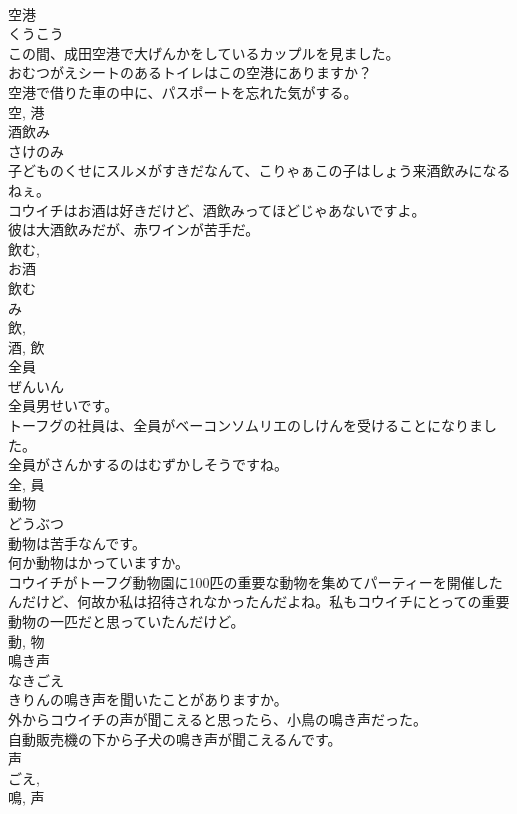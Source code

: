 \documentclass[8pt]{extreport}
\begin{document}
\begin{CJK}{UTF8}{min}
\\	空港	
\\	くうこう	
\\	この間、成田空港で大げんかをしているカップルを見ました。	
\\	おむつがえシートのあるトイレはこの空港にありますか？	
\\	空港で借りた車の中に、パスポートを忘れた気がする。	
\\	空, 港	
\\	酒飲み	
\\	さけのみ	
\\	子どものくせにスルメがすきだなんて、こりゃぁこの子はしょう来酒飲みになるねぇ。	
\\	コウイチはお酒は好きだけど、酒飲みってほどじゃあないですよ。	
\\	彼は大酒飲みだが、赤ワインが苦手だ。	
\\	飲む, 
\\	お酒 
\\	飲む 
\\	み 
\\	飲, 
\\	酒, 飲	
\\	全員	
\\	ぜんいん	
\\	全員男せいです。	
\\	トーフグの社員は、全員がベーコンソムリエのしけんを受けることになりました。	
\\	全員がさんかするのはむずかしそうですね。	
\\	全, 員	
\\	動物	
\\	どうぶつ	
\\	動物は苦手なんです。	
\\	何か動物はかっていますか。	
\\	コウイチがトーフグ動物園に100匹の重要な動物を集めてパーティーを開催したんだけど、何故か私は招待されなかったんだよね。私もコウイチにとっての重要動物の一匹だと思っていたんだけど。	
\\	動, 物	
\\	鳴き声	
\\	なきごえ	
\\	きりんの鳴き声を聞いたことがありますか。	
\\	外からコウイチの声が聞こえると思ったら、小鳥の鳴き声だった。	
\\	自動販売機の下から子犬の鳴き声が聞こえるんです。	
\\	声 
\\	ごえ, 
\\	鳴, 声	

\end{CJK}
\end{document}
